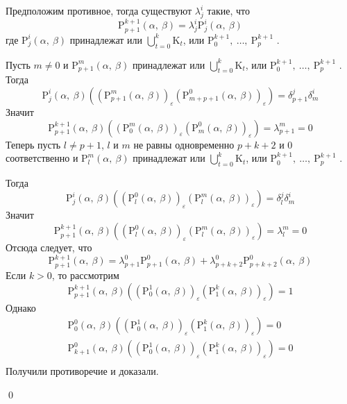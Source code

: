 \documentclass[12pt, reqno, a4paper, oneside, notitlepage]{amsart}
\makeatletter
\theoremstyle{mytheoremstyle}
\theoremstyle{myremarkstyle}
\numberwithin{equation}{section}
\renewenvironment{proof}[1][\proofname]{\par\indent {\bfseries #1\@addpunct{.} }}{\qed}
\makeatother
\begin{document}
\begin{proof}
  Предположим противное, тогда существуют $\lambda^i_j$ такие, что 
  \[
	\mathrm{P}^{k+1}_{p+1}(\alpha,\ \beta) = \lambda^i_j\mathrm{P}^{i}_j(\alpha,\ \beta)
  \]
  где $\mathrm{P}^{i}_j(\alpha,\ \beta)$ принадлежат или $\bigcup\limits_{t = 0}^k\mathrm{K}_t$, или  $\mathrm{P}^{k+1}_0,\ \dots,\ \mathrm{P}^{k+1}_p$ .

  Пусть $m \neq 0$ и $\mathrm{P}^m_{p+1}(\alpha,\ \beta)$ принадлежат или $\bigcup\limits_{t = 0}^k\mathrm{K}_t$, или  $\mathrm{P}^{k+1}_0,\ \dots,\ \mathrm{P}^{k+1}_p$ .
  Тогда \[
	\mathrm{P}^{i}_j(\alpha,\ \beta)\left(\left(\mathrm{P}^m_{p+1}(\alpha,\ \beta)\right)_\varepsilon\left(\mathrm{P}^0_{m+p+1}(\alpha,\ \beta)\right)_\varepsilon\right)  = 
	\delta^j_{p+1}\delta^i_m
  \]
  Значит  \[
	\mathrm{P}^{k+1}_{p+1}(\alpha,\ \beta)\left(\left(\mathrm{P}^m_0(\alpha,\ \beta)\right)_\varepsilon\left(\mathrm{P}^0_m(\alpha,\ \beta)\right)_\varepsilon\right) = \lambda^m_{p+1} = 0
  \]
  Теперь пусть $l \neq p+1$, $l$ и $m$ не равны одновременно $p+k+2$ и $0$ соответственно и $\mathrm{P}^{m}_l(\alpha,\ \beta)$ принадлежат или $\bigcup\limits_{t = 0}^k\mathrm{K}_t$, или  $\mathrm{P}^{k+1}_0,\ \dots,\ \mathrm{P}^{k+1}_p$ .

  Тогда \[
	\mathrm{P}^{i}_j(\alpha,\ \beta)\left(\left(\mathrm{P}^0_l(\alpha,\ \beta)\right)_\varepsilon\left(\mathrm{P}^m_l(\alpha,\ \beta)\right)_\varepsilon\right)  = \delta^j_l\delta^i_m
  \]
  Значит  \[
	\mathrm{P}^{k+1}_{p+1}(\alpha,\ \beta)\left(\left(\mathrm{P}^0_l(\alpha,\ \beta)\right)_\varepsilon\left(\mathrm{P}^m_l(\alpha,\ \beta)\right)_\varepsilon\right) = \lambda^m_l = 0
  \]
  Отсюда следует, что 
  \[
	\mathrm{P}^{k+1}_{p+1}(\alpha,\ \beta) = \lambda^0_{p+1}\mathrm{P}^0_{p+1}(\alpha,\ \beta) + \lambda^0_{p+k+2}\mathrm{P}^0_{p+k+2}(\alpha,\ \beta)
  \]
  Если $k > 0$, то рассмотрим 
  \[
	\mathrm{P}^{k+1}_{p+1}(\alpha,\ \beta)\left(\left(\mathrm{P}^1_0(\alpha,\ \beta)\right)_\varepsilon\left(\mathrm{P}^k_1(\alpha,\ \beta)\right)_\varepsilon\right) = 1
  \]
  Однако 
  \begin{eqnarray*}
	\mathrm{P}^0_0(\alpha,\ \beta)\left(\left(\mathrm{P}^1_0(\alpha,\ \beta)\right)_\varepsilon\left(\mathrm{P}^k_1(\alpha,\ \beta)\right)_\varepsilon\right) = 0\\
	\mathrm{P}^0_{k+1}(\alpha,\ \beta)\left(\left(\mathrm{P}^1_0(\alpha,\ \beta)\right)_\varepsilon\left(\mathrm{P}^k_1(\alpha,\ \beta)\right)_\varepsilon\right) = 0\\
  \end{eqnarray*}
  Получили противоречие и доказали.


\end{proof}
\end{document}
